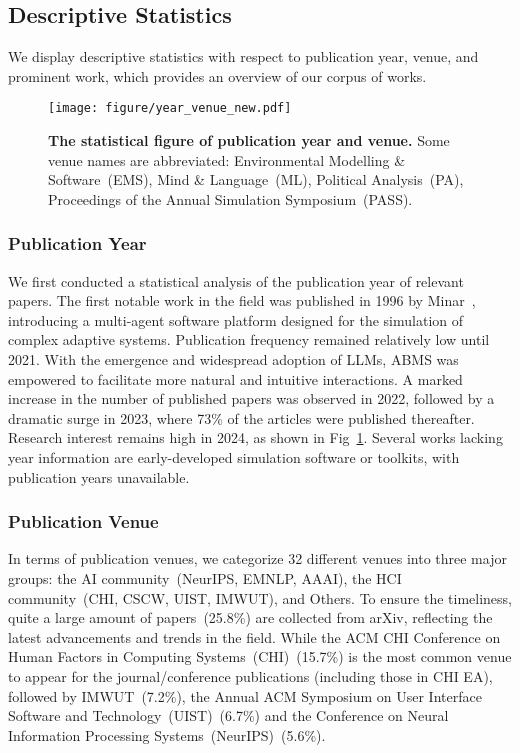 \subsection{Descriptive Statistics}
We display descriptive statistics with respect to publication year, venue, and prominent work, which provides an overview of our corpus of works.

\begin{figure}[ht]
  \centering
  \texttt{[image: figure/year\_venue\_new.pdf]}
  \caption{%
    \textbf{The statistical figure of publication year and venue.} Some venue names are abbreviated: Environmental Modelling \& Software~(EMS), Mind \& Language~(ML), Political Analysis~(PA), Proceedings of the Annual Simulation Symposium~(PASS). }
  \label{fig:stat}
\end{figure}

\subsubsection{Publication Year}
We first conducted a statistical analysis of the publication year of relevant papers. The first notable work in the field was published in 1996 by Minar\etal~\cite{minar1996swarm}, introducing a multi-agent software platform designed for the simulation of complex adaptive systems. Publication frequency remained relatively low until 2021. With the emergence and widespread adoption of LLMs, ABMS was empowered to facilitate more natural and intuitive interactions. A marked increase in the number of published papers was observed in 2022, followed by a dramatic surge in 2023, where 73\% of the articles were published thereafter. Research interest remains high in 2024, as shown in Fig~\ref{fig:stat}.
Several works lacking year information are early-developed simulation software or toolkits, with publication years unavailable.

\subsubsection{Publication Venue}
In terms of publication venues, we categorize 32 different venues into three major groups: the AI community~(\eg NeurIPS, EMNLP, AAAI), the HCI community~(\eg CHI, CSCW, UIST, IMWUT), and Others. To ensure the timeliness, quite a large amount of papers~(25.8\%) are collected from arXiv, reflecting the latest advancements and trends in the field. While the ACM CHI Conference on Human Factors in Computing Systems~(CHI)~(15.7\%) is the most common venue to appear for the journal/conference publications (including those in CHI EA), followed by IMWUT~(7.2\%), the Annual ACM Symposium on User Interface Software and Technology~(UIST)~(6.7\%) and the Conference on Neural Information Processing Systems~(NeurIPS)~(5.6\%).

